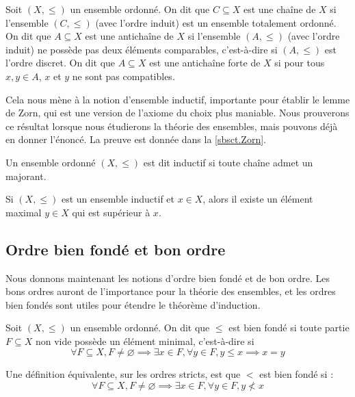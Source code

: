 \begin{definition}
  Soit $(X,\leq)$ un ensemble ordonné. On dit que $C\subseteq X$ est une chaîne
  de $X$ si l'ensemble $(C,\leq)$ (avec l'ordre induit) est un ensemble
  totalement ordonné. On dit que $A\subseteq X$ est une antichaîne de $X$ si
  l'ensemble $(A,\leq)$ (avec l'ordre induit) ne possède pas deux éléments
  comparables, c'est-à-dire si $(A,\leq)$ est l'ordre discret. On dit que
  $A\subseteq X$ est une antichaîne forte de $X$ si pour tous $x,y\in A$, $x$ et
  $y$ ne sont pas compatibles.
\end{definition}

Cela nous mène à la notion d'ensemble inductif, importante pour établir le lemme
de Zorn, qui est une version de l'axiome du choix plus maniable. Nous prouverons
ce résultat lorsque nous étudierons la théorie des ensembles, mais pouvons déjà
en donner l'énoncé. La preuve est donnée dans la \cref{sbsct.Zorn}.

\begin{definition}
  Un ensemble ordonné $(X,\leq)$ est dit inductif si toute chaîne admet un
  majorant.
\end{definition}

\begin{theorem}\label{thm.Zorn}
  Si $(X,\leq)$ est un ensemble inductif et $x\in X$, alors il existe un élément
  maximal $y \in X$ qui est supérieur à $x$.
\end{theorem}

\subsection{Ordre bien fondé et bon ordre}

Nous donnons maintenant les notions d'ordre bien fondé et de bon ordre. Les bons
ordres auront de l'importance pour la théorie des ensembles, et les ordres bien
fondés sont utiles pour étendre le théorème d'induction.

\begin{definition}
  Soit $(X,\leq)$ un ensemble ordonné. On dit que $\leq$ est bien fondé si toute
  partie $F\subseteq X$ non vide possède un élément minimal, c'est-à-dire si
  \[\forall F \subseteq X, F\neq \varnothing \implies \exists x\in F,
  \forall y\in F, y\leq x \implies x = y\]
\end{definition}

\begin{remark}
  Une définition équivalente, sur les ordres stricts, est que $<$ est bien fondé
  si :
  \[\forall F \subseteq X, F\neq \varnothing \implies \exists x \in F,
  \forall y \in F, y\nless x\]
\end{remark}

